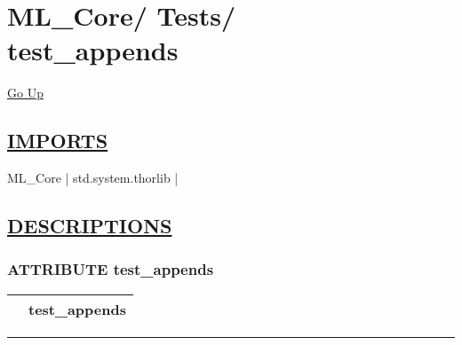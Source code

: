 \chapter*{\color{headfile}
{\large ML\_Core\slash\hspace{0pt}}
{\large Tests\slash\hspace{0pt}}
 \\
test_appends
}
\hypertarget{ecldoc:toc:ML_Core.Tests.test_appends}{}
\hyperlink{ecldoc:toc:root/ML_Core/Tests}{Go Up}

\section*{\underline{\textsf{IMPORTS}}}
\begin{doublespace}
{\large
ML\_Core |
std.system.thorlib |
}
\end{doublespace}

\section*{\underline{\textsf{DESCRIPTIONS}}}
\subsection*{\textsf{\colorbox{headtoc}{\color{white} ATTRIBUTE}
test\_appends}}

\hypertarget{ecldoc:ml_core.tests.test_appends}{}

{\renewcommand{\arraystretch}{1.5}
\begin{tabularx}{\textwidth}{|>{\raggedright\arraybackslash}l|X|}
\hline
\hspace{0pt}\mytexttt{\color{red} } & \textbf{test\_appends} \\
\hline
\end{tabularx}
}

\par


\rule{\linewidth}{0.5pt}
